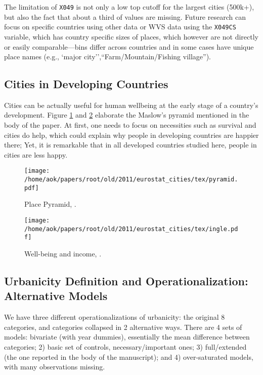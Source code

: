 \documentclass[11pt, letterpaper]{article}
\begin{document}
\begin{spacing}{1.4}
The limitation of \texttt{X049} is not only a low top cutoff for the largest cities (500k+), but also the fact that about a third of values are missing. Future research can focus on specific countries using other data or WVS data using the \texttt{X049CS} variable, which has country specific sizes of places, which however are not directly or easily comparable---bins differ across countries and in some cases have unique place names (e.g., `major city'',``Farm/Mountain/Fishing village''). 


\subsection*{Cities in Developing Countries}

Cities can be actually useful for human wellbeing at the early stage of a
country's development. Figure \ref{pyramid} and \ref{ingle} elaborate the
Maslow's pyramid mentioned in the body of the paper. At first, one needs to
focus on necessities such as survival and cities do help, which could explain
why people in developing countries are happier there; Yet, it is remarkable that
in all developed countries studied here, people in cities are less happy.

\begin{figure}[H]
\begin{centering}
 \texttt{[image: /home/aok/papers/root/old/2011/eurostat\_cities/tex/pyramid.pdf]}
 \caption{Place Pyramid, \citep[p 294]{florida08}.} \label{pyramid}
  \end{centering}
\end{figure}

\begin{figure}[H]
\begin{centering}
 \texttt{[image: /home/aok/papers/root/old/2011/eurostat\_cities/tex/ingle.pdf]}
 \caption{Well-being and income, \citep{inglehart97}.} \label{ingle}
  \end{centering}
\end{figure}


\subsection*{Urbanicity Definition and Operationalization: Alternative Models} 

We have three different operationalizations of urbanicity: the original 8
categories, and categories collapsed in 2 alternative ways. There are 4 sets of
models: bivariate (with year dummies), essentially the mean difference between
categories; 2) basic set of controls, necessary/important ones; 3)
full/extended (the one reported in the body of the manuscript); and 4) over-saturated models,
with many observations missing. 


\end{spacing}
\end{document}
